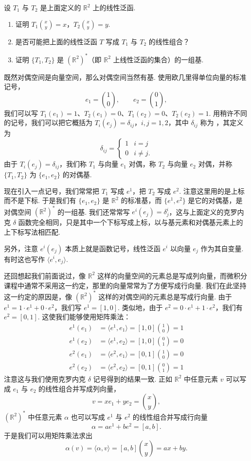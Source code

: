 \begin{question}\label{q:1-8}
设 $T_1$ 与 $T_2$ 是上面定义的 $\mathbb{R}^2$ 上的线性泛函.
\begin{enumerate}
  \item[(a)] 证明 $T_1\binom{x}{y}=x$，$T_2\binom{x}{y}=y$.
  \item[(b)] 是否可能把上面的线性泛函 $T$ 写成 $T_1$ 与 $T_2$ 的线性组合？
  \item[(c)] 证明 $\{T_1,T_2\}$ 是 $(\mathbb{R}^2)^*$（即 $\mathbb{R}^2$ 上线性泛函的集合）的一组基.
\end{enumerate}
\end{question}

既然对偶空间是向量空间，那么对偶空间当然有基. 使用欧几里得单位向量的标准记号，
\[
e_1=\binom{1}{0},\qquad e_2=\binom{0}{1},
\]
我们可以写 $T_1(e_1)=1$、$T_2(e_1)=0$、$T_1(e_2)=0$、$T_2(e_2)=1$. 用稍许不同的记号，我们可以把它概括为 $T_i(e_j)=\delta_{ij}$，$i,j=1,2$，其中 $\delta_{ij}$ 称为 ，其定义为
\[
\delta_{ij}=\begin{cases}1&i=j\\0&i\neq j.\end{cases}
\]
由于 $T_i(e_j)=\delta_{ij}$，我们称 $T_1$ 与向量 $e_1$ 对偶，称 $T_2$ 与向量 $e_2$ 对偶，并称 $\{T_1,T_2\}$ 为 $\{e_1,e_2\}$ 的对偶基.

现在引入一点记号，我们常常把 $T_1$ 写成 $e^1$，把 $T_2$ 写成 $e^2$. 注意这里用的是上标而不是下标. 于是我们有 $\{e_1,e_2\}$ 是 $\mathbb{R}^2$ 的标准基，而 $\{e^1,e^2\}$ 是它的对偶基，是对偶空间 $(\mathbb{R}^2)^*$ 的一组基. 我们还常常写 $e^i(e_j)=\delta_j^i$，这与上面定义的克罗内克 $\delta$ 函数完全相同，只是其中一个下标写成上标，以与基元素和对偶基元素上的上下标写法相匹配.

另外，注意 $e^i(e_j)$ 本质上就是函数记号，线性泛函 $e^i$ 以向量 $e_j$ 作为其自变量. 有时这也写作 $\langle e^i,e_j\rangle$.

还回想起我们前面说过，像 $\mathbb{R}^2$ 这样的向量空间的元素总是写成列向量，而微积分课程中通常不采用这一约定，那里的向量常常为了方便写成行向量. 我们在此坚持这一约定的原因是，像 $(\mathbb{R}^2)^*$ 这样的对偶空间的元素总是写成行向量. 由于 $e^1=1\cdot e^1+0\cdot e^2$，我们写 $e^1=[1,0]$. 类似地，由于 $e^2=0\cdot e^1+1\cdot e^2$，我们有 $e^2=[0,1]$. 这使我们能够使用矩阵乘法：
\begin{align*}
e^1(e_1)&=\langle e^1,e_1\rangle=[1,0]\binom{1}{0}=1\\
e^1(e_2)&=\langle e^1,e_2\rangle=[1,0]\binom{0}{1}=0\\
e^2(e_1)&=\langle e^2,e_1\rangle=[0,1]\binom{1}{0}=0\\
e^2(e_2)&=\langle e^2,e_2\rangle=[0,1]\binom{0}{1}=1
\end{align*}
注意这与我们使用克罗内克 $\delta$ 记号得到的结果一致. 正如 $\mathbb{R}^2$ 中任意元素 $v$ 可以写成 $e_1$ 与 $e_2$ 的线性组合并写成列向量，
\[
v=xe_1+ye_2=\binom{x}{y},
\]
$(\mathbb{R}^2)^*$ 中任意元素 $\alpha$ 也可以写成 $e^1$ 与 $e^2$ 的线性组合并写成行向量
\[
\alpha=ae^1+be^2=[a,b].
\]
于是我们可以用矩阵乘法求出
\[
\alpha(v)=\langle\alpha,v\rangle=[a,b]\binom{x}{y}=ax+by.
\]

